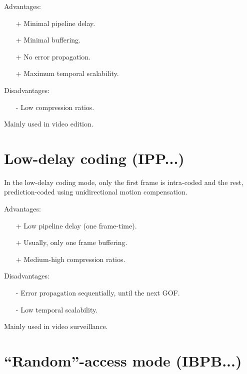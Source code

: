 Advantages:
\begin{itemize}
\item [+] Minimal pipeline delay.
\item [+] Minimal buffering.
\item [+] No error propagation.
\item [+] Maximum temporal scalability.
\end{itemize}

Disadvantages:
\begin{enumerate}
\item [-] Low compression ratios.
\end{enumerate}

Mainly used in video edition.

\section{Low-delay coding (IPP...)}

In the low-delay coding mode, only the first frame is intra-coded and
the rest, prediction-coded using unidirectional motion
compensation.

Advantages:
\begin{itemize}
\item [+] Low pipeline delay (one frame-time).
\item [+] Usually, only one frame buffering.
\item [+] Medium-high compression ratios.
\end{itemize}

Disadvantages:
\begin{enumerate}
\item [-] Error propagation sequentially, until the next GOF.
\item [-] Low temporal scalability.
\end{enumerate}

Mainly used in video surveillance.

\section{``Random''-access mode (IBPB...)}
\label{sec:random}

